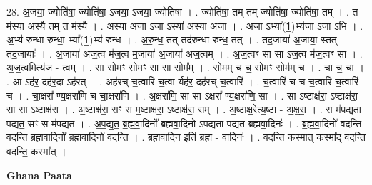 \documentclass[17pt]{extarticle}
\begin{document}
28. अ॒जया॒ ज्योति॑षा॒ ज्योति॑षा॒ ऽजया॒ ऽजया॒ ज्योति॑षा । . ज्योति॑षा॒ तम् तम् ज्योति॑षा॒ ज्योति॑षा॒ तम् । . त म॑स्या अस्यै॒ तम् त म॑स्यै । . अ॒स्या॒ अ॒जा ऽजा ऽस्या॑ अस्या अ॒जा । . अ॒जा ऽभ्या᳚(1॒)भ्य॑जा ऽजा ऽभि । . अ॒भ्य॑ रुन्धा रुन्धा॒ भ्या᳚(1॒)भ्य॑ रुन्ध । . अ॒रु॒न्ध॒ तत् तद॑रुन्धा रुन्ध॒ तत् । . तद॒जाया॑ अ॒जाया॒ स्तत् तद॒जायाः᳚ । . अ॒जाया॑ अज॒त्व म॑ज॒त्व म॒जाया॑ अ॒जाया॑ अज॒त्वम् । . अ॒ज॒त्वꣳ सा सा ऽज॒त्व म॑ज॒त्वꣳ सा । . अ॒ज॒त्वमित्य॑ज - त्वम् । . सा सोमꣳ॒॒ सोमꣳ॒॒ सा सा सोम᳚म् । . सोम॑म् च च॒ सोमꣳ॒॒ सोम॑म् च । . चा च॒ चा । . आ ऽह॑र॒ दह॑र॒दा ऽह॑रत् । . अह॑रच् च॒त्वारि॑ च॒त्वा र्यह॑र॒ दह॑रच् च॒त्वारि॑ । . च॒त्वारि॑ च च च॒त्वारि॑ च॒त्वारि॑ च । . चा॒क्षरा᳚ ण्य॒क्षरा॑णि च चा॒क्षरा॑णि । . अ॒क्षरा॑णि॒ सा सा ऽक्षरा᳚ ण्य॒क्षरा॑णि॒ सा । . सा ऽष्टाक्ष॑रा॒ ऽष्टाक्ष॑रा॒ सा सा ऽष्टाक्ष॑रा । . अ॒ष्टाक्ष॑रा॒ सꣳ स म॒ष्टाक्ष॑रा॒ ऽष्टाक्ष॑रा॒ सम् । . अ॒ष्टाक्ष॒रेत्य॒ष्टा - अ॒क्ष॒रा॒ । . स म॑पद्यता पद्यत॒ सꣳ स म॑पद्यत । . अ॒प॒द्य॒त॒ ब्र॒ह्म॒वा॒दिनो᳚ ब्रह्मवा॒दिनो॑ ऽपद्यता पद्यत ब्रह्मवा॒दिनः॑ । . ब्र॒ह्म॒वा॒दिनो॑ वदन्ति वदन्ति ब्रह्मवा॒दिनो᳚ ब्रह्मवा॒दिनो॑ वदन्ति । . ब्र॒ह्म॒वा॒दिन॒ इति॑ ब्रह्म - वा॒दिनः॑ । . व॒द॒न्ति॒ कस्मा॒त् कस्मा᳚द् वदन्ति वदन्ति॒ कस्मा᳚त् । \newline

\textbf{Ghana Paata } \newline
\end{document}
